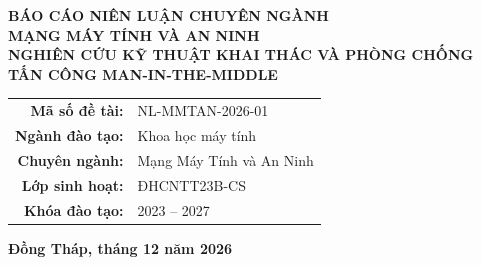 \documentclass[12pt,a4paper,oneside]{report}
\begin{document}
\begin{titlepage}
{\fontsize{14pt}{18pt}\selectfont\bfseries BÁO CÁO NIÊN LUẬN CHUYÊN NGÀNH}\\[0.3cm]
{\fontsize{13pt}{17pt}\selectfont\bfseries MẠNG MÁY TÍNH VÀ AN NINH}\\[0.8cm]

{\fontsize{16pt}{22pt}\selectfont\bfseries NGHIÊN CỨU KỸ THUẬT KHAI THÁC VÀ PHÒNG CHỐNG TẤN CÔNG MAN-IN-THE-MIDDLE}\\[1.2cm]

\begin{tabular}{rl}
  \textbf{Mã số đề tài:} & NL-MMTAN-2026-01 \\
  \textbf{Ngành đào tạo:} & Khoa học máy tính \\
  \textbf{Chuyên ngành:} & Mạng Máy Tính và An Ninh \\
  \textbf{Lớp sinh hoạt:} & ĐHCNTT23B-CS \\
  \textbf{Khóa đào tạo:} & 2023 -- 2027 \\
\end{tabular}

\vfill
{\fontsize{13pt}{17pt}\selectfont\bfseries Đồng Tháp, tháng 12 năm 2026}
\end{titlepage}
\end{document}

